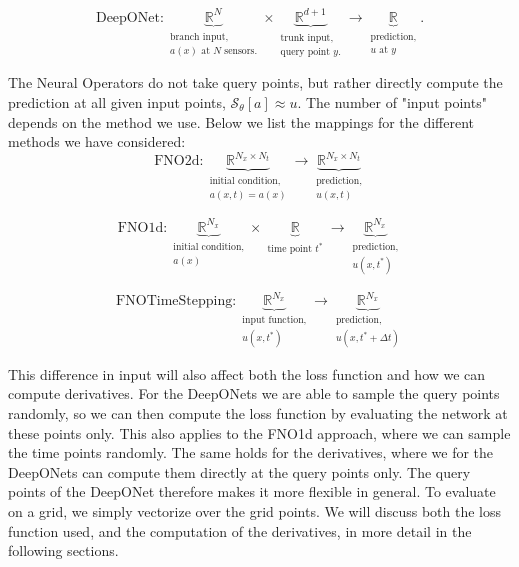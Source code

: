 \begin{equation}
    \text{DeepONet} : 
    \underbrace{\mathbb{R}^{N}}_{\substack{\text{branch input,} \\ \text{\(a(x)\) at \(N\) sensors.}}}
    \times 
    \underbrace{\mathbb{R}^{d+1}}_{\substack{\text{trunk input,} \\ \text{query point \(y\).}}} 
    \to 
    \underbrace{\mathbb{R}}_{\substack{\text{prediction,} \\ \text{\(u\) at \(y\)}}}.
\end{equation}

The Neural Operators do not take query points, but rather directly compute the prediction at all given input points, 
\(\mathcal{S}_\theta[a] \approx u\). The number of "input points" depends on the method we use. Below we list the mappings for the different methods we have considered:
\begin{equation}
    \text{FNO2d} : 
    \underbrace{\mathbb{R}^{N_x \times N_t}}_{\substack{\text{initial condition,} \\ \text{\(a(x,t)=a(x)\)}}}
    \to 
    \underbrace{\mathbb{R}^{N_x \times N_t}}_{\substack{\text{prediction,} \\ \text{\(u(x,t)\)}}}
\end{equation}

\begin{equation}
    \text{FNO1d} : 
    \underbrace{\mathbb{R}^{N_x}}_{\substack{\text{initial condition,} \\ \text{\(a(x)\)}}} \times \underbrace{\mathbb{R}}_{\substack{\text{time point \(t^*\)}}}
    \to 
    \underbrace{\mathbb{R}^{N_x}}_{\substack{\text{prediction,} \\ \text{\(u(x,t^*)\)}}}
\end{equation}

\begin{equation}
    \text{FNOTimeStepping} : 
    \underbrace{\mathbb{R}^{N_x}}_{\substack{\text{input function,} \\ \text{\(u(x,t^*)\)}}} 
    \to 
    \underbrace{\mathbb{R}^{N_x}}_{\substack{\text{prediction,} \\ \text{\(u(x,t^*+\Delta t)\)}}}
\end{equation}

This difference in input will also affect both the loss function and how we can compute derivatives. 
For the DeepONets we are able to sample the query points randomly, so we can then compute the loss function by evaluating the network at these points only.
This also applies to the FNO1d approach, where we can sample the time points randomly. The same holds for the derivatives, where we for the DeepONets can compute them directly at the query points only.
The query points of the DeepONet therefore makes it more flexible in general. To evaluate on a grid, we simply vectorize over the grid points.
We will discuss both the loss function used, and the computation of the derivatives, in more detail in the following sections.

